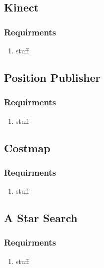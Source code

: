   
  \subsection{Kinect}
     \subsubsection{Requirments}
     \begin{enumerate}
       \item stuff
       \end{enumerate}

  \subsection{Position Publisher}
     \subsubsection{Requirments}
     \begin{enumerate}
       \item stuff
       \end{enumerate}


     \subsection{Costmap}
     \subsubsection{Requirments}
     \begin{enumerate}
       \item stuff
       \end{enumerate}
       

  \subsection{A Star Search}
    \subsubsection{Requirments}
     \begin{enumerate}
       \item stuff
       \end{enumerate}



